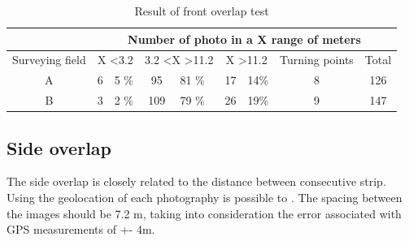 \begin{table}[H]
\centering
\begin{tabular}{|c|c|l|c|l|c|l|c|c|}
\hline
 & \multicolumn{8}{c|}{Number of photo in a X range of meters}                                                                                                                            \\ \hline
Surveying field         & \multicolumn{2}{c|}{X \textless 3.2} & \multicolumn{2}{c|}{3.2 \textless X \textgreater 11.2} & \multicolumn{2}{c|}{X \textgreater 11.2} & Turning points & Total                      \\ \hline
A                       & 6               & 5 \%               & 95                        & 81 \%                      & 17                 & 14\%                & 8              & 126                        \\ \hline
B                       & 3               & 2 \%                & 109                       & 79 \%                      & 26                 & 19\%                & 9              &  147 \\ \hline
\end{tabular}
\caption{Result of front overlap test}
\label{Table:FrontOverlap} 
\end{table}
\subsection{Side overlap}
The side overlap is closely related to the distance between consecutive strip.  Using the geolocation of each photography is possible to . The spacing between the images should be 7.2 m, taking into consideration the error associated with GPS measurements of +- 4m. 

